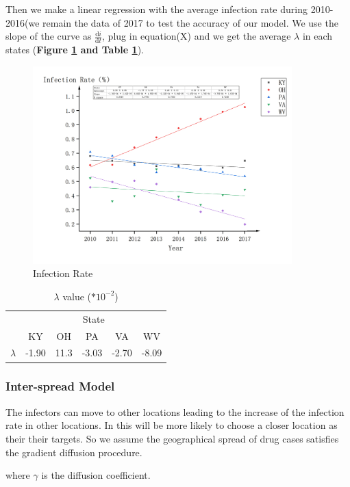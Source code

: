 \documentclass[12pt]{article}
\begin{document}
Then we make a linear regression with the average infection rate during 2010-2016(we remain the data of 2017 to test the accuracy of our model. We use the slope of the curve as $\frac{\mathrm{d} i}{\mathrm{d} t}$, plug in equation(X) and we get the average $\lambda$ in each states (\textbf{Figure \ref{MFigure1} and Table \ref{lambda}}).

\begin{figure}[h]
\centering
\includegraphics[width=10cm]{plots/MFigure1.png}
\caption{Infection Rate}
\label{MFigure1}
\end{figure}

\begin{table}[h]
\centering
\begin{tabular}{cccccc}
  \toprule
   & \multicolumn{5}{c}{State} \\
  \cmidrule{2-6}
& KY & OH & PA & VA & WV  \\
  \midrule
  $\lambda$ & -1.90 & 11.3 & -3.03 & -2.70 & -8.09  \\
  \bottomrule
\end{tabular}
\caption{$\lambda$ value ($*10^{-2}$)}
\label{lambda}
\end{table}

\subsubsection{Inter-spread Model}
The infectors can move to other locations leading to the increase of the infection rate in other locations. In this will be more likely to choose a closer location as their their targets. So we assume the geographical spread of drug cases satisfies the gradient diffusion procedure.

where $\gamma$ is the diffusion coefficient.
\end{document}
